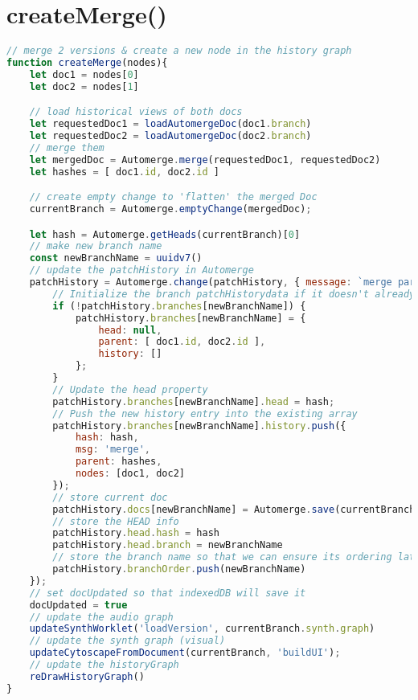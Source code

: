 \section{createMerge()}

\begin{lstlisting}[language=JavaScript, caption={The createMerge function takes two changeNodes selected by the player and merges them. A new branch is created to store the result of the merge. The unified patch state is then loaded into the main application and rendered in the visual and audio synth graphs.}, label={lst:createMerge-function}]
// merge 2 versions & create a new node in the history graph
function createMerge(nodes){
    let doc1 = nodes[0]
    let doc2 = nodes[1]

    // load historical views of both docs
    let requestedDoc1 = loadAutomergeDoc(doc1.branch)
    let requestedDoc2 = loadAutomergeDoc(doc2.branch)
    // merge them
    let mergedDoc = Automerge.merge(requestedDoc1, requestedDoc2)
    let hashes = [ doc1.id, doc2.id ]

    // create empty change to 'flatten' the merged Doc
    currentBranch = Automerge.emptyChange(mergedDoc);

    let hash = Automerge.getHeads(currentBranch)[0]
    // make new branch name
    const newBranchName = uuidv7()
    // update the patchHistory in Automerge
    patchHistory = Automerge.change(patchHistory, { message: `merge parents: ${doc1.id} ${doc2.id} `}, (patchHistory) => {
        // Initialize the branch patchHistorydata if it doesn't already exist
        if (!patchHistory.branches[newBranchName]) {
            patchHistory.branches[newBranchName] = { 
                head: null, 
                parent: [ doc1.id, doc2.id ], 
                history: [] 
            };           
        }
        // Update the head property
        patchHistory.branches[newBranchName].head = hash;
        // Push the new history entry into the existing array
        patchHistory.branches[newBranchName].history.push({
            hash: hash,
            msg: 'merge',
            parent: hashes,
            nodes: [doc1, doc2]
        });
        // store current doc
        patchHistory.docs[newBranchName] = Automerge.save(currentBranch)        
        // store the HEAD info
        patchHistory.head.hash = hash
        patchHistory.head.branch = newBranchName
        // store the branch name so that we can ensure its ordering later on
        patchHistory.branchOrder.push(newBranchName)
    });
    // set docUpdated so that indexedDB will save it
    docUpdated = true
    // update the audio graph
    updateSynthWorklet('loadVersion', currentBranch.synth.graph)
    // update the synth graph (visual)
    updateCytoscapeFromDocument(currentBranch, 'buildUI');
    // update the historyGraph
    reDrawHistoryGraph()
}
\end{lstlisting}

